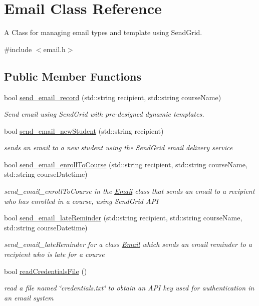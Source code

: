 \hypertarget{class_email}{}\section{Email Class Reference}
\label{class_email}


A Class for managing email types and template using Send\+Grid.  




{\ttfamily \#include $<$email.\+h$>$}

\subsection*{Public Member Functions}
\begin{DoxyCompactItemize}
\item 
bool \hyperlink{class_email_af5c194f8670d4e2fb6153c9c3bf15c48}{send\+\_\+email\+\_\+record} (std\+::string recipient, std\+::string course\+Name)
\begin{DoxyCompactList}\small\item\em Send email using Send\+Grid with pre-\/designed dynamic templates. \end{DoxyCompactList}\item 
bool \hyperlink{class_email_aad6b1fc223be02eb81439a843ea37320}{send\+\_\+email\+\_\+new\+Student} (std\+::string recipient)
\begin{DoxyCompactList}\small\item\em sends an email to a new student using the Send\+Grid email delivery service \end{DoxyCompactList}\item 
bool \hyperlink{class_email_aff8985b743a5077a71222685c3c46551}{send\+\_\+email\+\_\+enroll\+To\+Course} (std\+::string recipient, std\+::string course\+Name, std\+::string course\+Datetime)
\begin{DoxyCompactList}\small\item\em send\+\_\+email\+\_\+enroll\+To\+Course in the \hyperlink{class_email}{Email} class that sends an email to a recipient who has enrolled in a course, using Send\+Grid A\+P\+I \end{DoxyCompactList}\item 
bool \hyperlink{class_email_a3522905a60977cac1c8d99d4c911f3ee}{send\+\_\+email\+\_\+late\+Reminder} (std\+::string recipient, std\+::string course\+Name, std\+::string course\+Datetime)
\begin{DoxyCompactList}\small\item\em send\+\_\+email\+\_\+late\+Reminder for a class \hyperlink{class_email}{Email} which sends an email reminder to a recipient who is late for a course \end{DoxyCompactList}\item 
bool \hyperlink{class_email_af94727858b272dfb14a9f1224a8f2da1}{read\+Credentials\+File} ()
\begin{DoxyCompactList}\small\item\em read a file named \char`\"{}credentials.\+txt\char`\"{} to obtain an A\+P\+I key used for authentication in an email system \end{DoxyCompactList}\end{DoxyCompactItemize}
